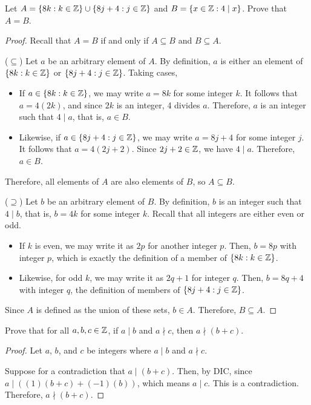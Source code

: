 \question Let $A=\{8k : k\in\mathbb{Z}\}\cup\{8j+4 : j\in\mathbb{Z}\}$ and $B=\{x\in\mathbb{Z} : 4 \mid x\}$.
Prove that $A=B$.
\begin{proof}
  Recall that $A=B$ if and only if $A\subseteq B$ and $B \subseteq A$.

  ($\subseteq$) Let $a$ be an arbitrary element of $A$.
  By definition, $a$ is either an element of $\{8k : k\in\mathbb{Z}\}$ or $\{8j+4 : j\in\mathbb{Z}\}$.
  Taking cases,
  \begin{itemize}
    \item If $a\in\{8k : k\in\mathbb{Z}\}$, we may write $a=8k$ for some integer $k$.
          It follows that $a=4(2k)$, and since $2k$ is an integer, 4 divides $a$.
          Therefore, $a$ is an integer such that $4 \mid a$, that is, $a \in B$.
    \item Likewise, if $a\in\{8j+4 : j\in\mathbb{Z}\}$, we may write $a=8j+4$ for some integer $j$.
          It follows that $a=4(2j+2)$. Since $2j+2\in\mathbb{Z}$, we have $4 \mid a$.
          Therefore, $a\in B$.
  \end{itemize}
  Therefore, all elements of $A$ are also elements of $B$, so $A \subseteq B$.

  ($\supseteq$) Let $b$ be an arbitrary element of $B$.
  By definition, $b$ is an integer such that $4 \mid b$, that is, $b = 4k$ for some integer $k$.
  Recall that all integers are either even or odd.
  \begin{itemize}
    \item If $k$ is even, we may write it as $2p$ for another integer $p$.
          Then, $b = 8p$ with integer $p$, which is exactly the definition of a member of $\{8k : k\in\mathbb{Z}\}$.
    \item Likewise, for odd $k$, we may write it as $2q+1$ for integer $q$.
          Then, $b = 8q+4$ with integer $q$, the definition of members of $\{8j+4 : j\in\mathbb{Z}\}$.
  \end{itemize}
  Since $A$ is defined as the union of these sets, $b\in A$.
  Therefore, $B \subseteq A$.
\end{proof}


\question Prove that for all $a,b,c\in\mathbb{Z}$, if $a \mid b$ and $a \nmid c$, then $a \nmid (b+c)$.
\begin{proof}
  Let $a$, $b$, and $c$ be integers where $a \mid b$ and $a \nmid c$.

  Suppose for a contradiction that $a \mid (b+c)$.
  Then, by DIC, since $a \mid ((1)(b+c) + (-1)(b))$, which means $a \mid c$.
  This is a contradiction.
  Therefore, $a \nmid (b+c)$.
\end{proof}



